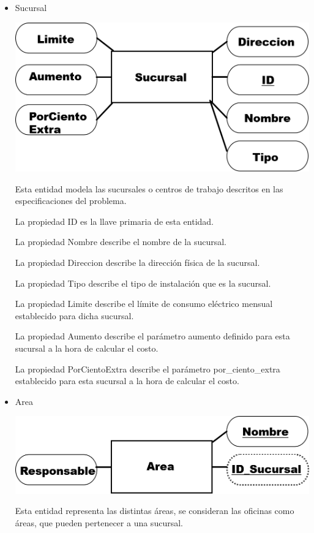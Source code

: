 \documentclass{article}
\begin{document}
\begin{itemize}
\item Sucursal

\includegraphics[scale=0.5]{Imagenes/Informe1/EntidadSucursal.png}

Esta entidad modela las sucursales o centros de trabajo descritos en las especificaciones del problema.

La propiedad ID es la llave primaria de esta entidad.

La propiedad Nombre describe el nombre de la sucursal.

La propiedad Direccion describe la dirección física de la sucursal.

La propiedad Tipo describe el tipo de instalación que es la sucursal.

La propiedad Limite describe el límite de consumo eléctrico mensual establecido para dicha sucursal.

La propiedad Aumento describe el parámetro aumento definido para esta sucursal a la hora de calcular el costo.

La propiedad PorCientoExtra describe el parámetro por\_ciento\_extra establecido para esta sucursal a la hora de calcular el costo.
\item Area

\includegraphics[scale=0.5]{Imagenes/Informe1/EntidadArea.png}

Esta entidad representa las distintas áreas, se consideran las oficinas como áreas, que pueden pertenecer a una sucursal.


\end{itemize}
\end{document}
